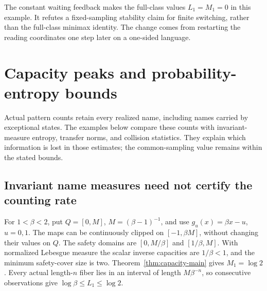 \documentclass[11pt,reqno]{amsart}
\numberwithin{equation}{section}
\theoremstyle{definition}
\begin{document}
The constant waiting feedback makes the full-class values
$L_1=M_1=0$ in this example. It refutes a fixed-sampling
stability claim for finite switching, rather than the full-class
minimax identity. The change comes from restarting the reading
coordinates one step later on a one-sided language.


\section{Capacity peaks and probability-entropy bounds}
\label{app:capacity-boundaries}

Actual pattern counts retain every realized name, including names
carried by exceptional states. The examples below compare these
counts with invariant-measure entropy, transfer norms, and collision
statistics. They explain which information is lost in those
estimates; the common-sampling value remains within the stated
bounds.

\subsection{Invariant name measures need not certify the counting rate}

For $1<\beta<2$, put $Q=[0,M]$, $M=(\beta-1)^{-1}$, and use
$g_u(x)=\beta x-u$, $u=0,1$. The maps can be continuously clipped
on $[-1,\beta M]$, without changing their values on $Q$.
The safety domains are $[0,M/\beta]$ and $[1/\beta,M]$.
With normalized Lebesgue measure the scalar inverse capacities
are $1/\beta<1$, and the minimum safety-cover size is two.
Theorem~\ref{thm:capacity-main} gives $M_1=\log2$.
Every actual length-$n$ fiber lies in an interval of length
$M\beta^{-n}$, so consecutive observations give
$\log\beta\le L_1\le\log2$.
\end{document}
